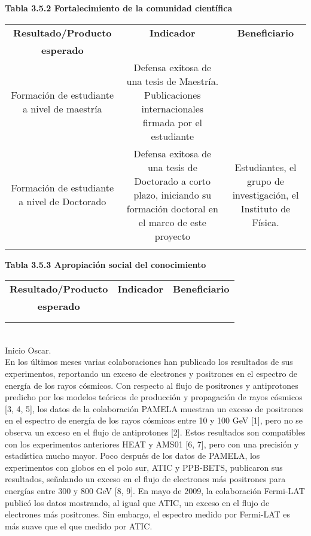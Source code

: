 \begin{ideas}
\textbf{Tabla 3.5.2 Fortalecimiento de la comunidad científica}\\
\begin{tabular}{|c|c|c|}\hline
   \textbf{Resultado/Producto}&\textbf{Indicador} & \textbf{Beneficiario}\\
   \textbf{esperado}& & \\\hline
 \parbox[t]{4cm}{Formación de estudiante a nivel de maestría} &\parbox[t]{4cm}{Defensa exitosa de una tesis de Maestría. Publicaciones internacionales firmada por el estudiante} & \\\hline 
\parbox[t]{4cm}{Formación de estudiante a nivel de Doctorado}  & \parbox[t]{4cm}{Defensa exitosa de una tesis de Doctorado a corto plazo, iniciando su formación doctoral en el marco de este proyecto}& \parbox[t]{4cm}{Estudiantes, el grupo de investigación, el Instituto de Física.} \\\hline
\parbox[t]{4cm}{}  & \parbox[t]{4cm}{}& \parbox[t]{4cm}{} \\\hline
 \end{tabular}

\textbf{Tabla 3.5.3 Apropiación social del conocimiento}\\
\begin{tabular}{|c|c|c|}\hline
   \textbf{Resultado/Producto}&\textbf{Indicador} & \textbf{Beneficiario}\\
   \textbf{esperado}& & \\\hline
\parbox[t]{4cm}{}  & \parbox[t]{4cm}{}& \parbox[t]{4cm}{} \\\hline
   & & \\\hline
 \end{tabular}
\\
Inicio Oscar.\\
En los últimos meses varias colaboraciones han publicado los resultados de sus experimentos, 
reportando un exceso de electrones y positrones  en el espectro de energía de los rayos cósmicos. 
Con respecto al flujo de positrones y antiprotones predicho por los modelos teóricos de producción y 
propagación de rayos cósmicos [3, 4, 5], los datos de la colaboración PAMELA muestran un exceso de 
positrones en el espectro de energía de los rayos cósmicos entre 10 y 100 GeV [1], pero no se 
observa un exceso en el flujo de antiprotones [2]. Estos resultados son compatibles con los 
experimentos anteriores HEAT y AMS01  [6, 7], pero con una precisión y estadística mucho mayor. 
Poco después de los datos de PAMELA, los experimentos con globos en el polo sur, ATIC y PPB-BETS, 
publicaron sus resultados, señalando un exceso en el flujo de electrones más positrones para energías 
entre 300 y 800 GeV [8, 9]. En mayo de 2009, la colaboración Fermi-LAT publicó los datos mostrando, 
al igual que ATIC, un exceso en el flujo de electrones más positrones. Sin embargo, 
el espectro medido por Fermi-LAT es más suave que el que medido por ATIC.


\end{ideas}
